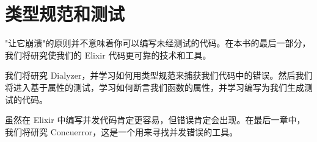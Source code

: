 \part{类型规范和测试}\label{part3}

"让它崩溃"的原则并不意味着你可以编写未经测试的代码。在本书的最后一部分，我们将研究使我们的
Elixir 代码更可靠的技术和工具。

我们将研究
Dialyzer，并学习如何用类型规范来捕获我们代码中的错误。然后我们将进入基于属性的测试，学习如何断言我们函数的属性，并学习编写为我们生成测试的代码。

虽然在 Elixir
中编写并发代码肯定更容易，但错误肯定会出现。在最后一章中，我们将研究
Concuerror，这是一个用来寻找并发错误的工具。
